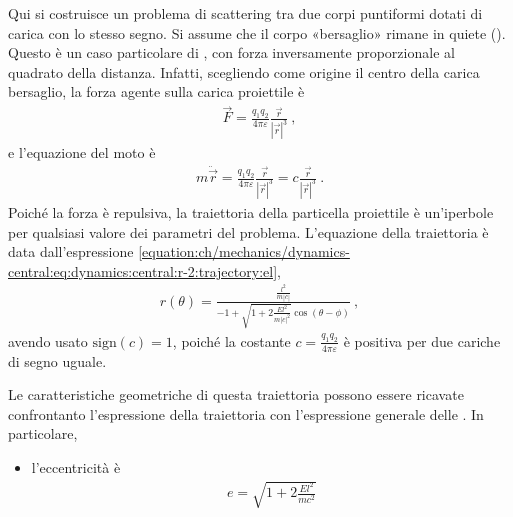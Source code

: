 \documentclass[letterpaper,10pt,italian]{jupyterBook}
\begin{document}
\sphinxAtStartPar
{} Qui si costruisce un problema di scattering tra due corpi puntiformi dotati di carica con lo stesso segno. Si assume che il corpo «bersaglio» rimane in quiete (). Questo è un caso particolare di {\hyperref[\detokenize{ch/mechanics/dynamics-central:physics-hs-mechanics-dynamics-motion-central-r-2}]{}}, con forza inversamente proporzionale al quadrato della distanza. Infatti, scegliendo come origine il centro della carica bersaglio, la forza agente sulla carica proiettile è
\begin{equation*}
\begin{split}\vec{F} = \frac{q_1 q_2}{4\pi\varepsilon} \frac{\vec{r}}{|\vec{r}|^3} \ ,\end{split}
\end{equation*}
\sphinxAtStartPar
e l’equazione del moto è
\begin{equation*}
\begin{split}m \ddot{\vec{r}} = \frac{q_1 q_2}{4\pi\varepsilon} \frac{\vec{r}}{|\vec{r}|^3} = c \frac{\vec{r}}{|\vec{r}|^3} \ .\end{split}
\end{equation*}
\sphinxAtStartPar
Poiché la forza è repulsiva, la traiettoria della particella proiettile è un’iperbole per qualsiasi valore dei parametri del problema. L’equazione della traiettoria è data dall’espressione \eqref{equation:ch/mechanics/dynamics-central:eq:dynamics:central:r-2:trajectory:el},
\begin{equation*}
\begin{split}r(\theta) = \frac{\frac{l^2}{m|c|}}{-1 + \sqrt{1 + 2 \frac{E l^2}{m|c|^2}} \cos(\theta-\phi)} \ ,\end{split}
\end{equation*}
\sphinxAtStartPar
avendo usato \(\text{sign}(c) = 1\), poiché la costante \(c = \frac{q_1 q_2}{4\pi\varepsilon}\) è positiva per due cariche di segno uguale.

\sphinxAtStartPar
{} Le caratteristiche geometriche di questa traiettoria possono essere ricavate confrontanto l’espressione della traiettoria con l’espressione generale delle . In particolare,
\begin{itemize}
\item {} 
\sphinxAtStartPar
l’eccentricità è
\begin{equation*}
\begin{split}e = \sqrt{1+2\frac{E l^2}{m c^2}}\end{split}
\end{equation*}
\end{itemize}
\end{document}
